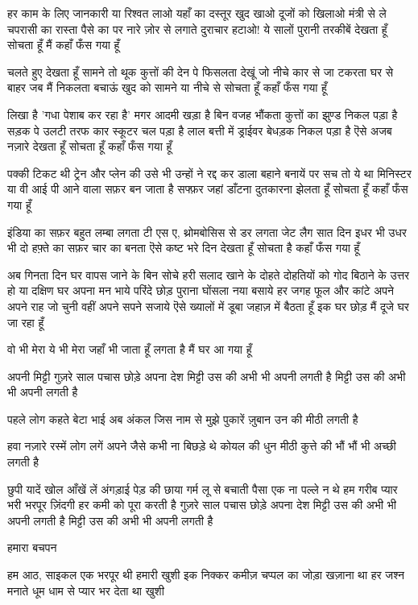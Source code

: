 हर काम के लिए जानकारी या रिश्वत लाओ
यहाँ का दस्तूर खुद खाओ दूजों को खिलाओ 
मंत्री से ले चपरासी का रास्ता पैसे का
पर नारे ज़ोर से लगाते दुराचार हटाओ!
ये सालों पुरानी तरकीबें देखता हूँ
सोचता हूँ मैं कहाँ फँस गया हूँ

चलते हुए देखता हूँ सामने तो
थूक कुत्तों की देन पे फिसलता
देखूं जो नीचे कार से जा टकरता
घर से बाहर जब मैं निकलता
बचाऊं खुद को सामने या नीचे से
सोचता हूँ कहाँ फँस गया हूँ

लिखा है 'गधा पेशाब कर रहा है' 
मगर आदमी खड़ा है
बिन वजह भौंकता कुत्तों का झुण्ड 
निकल पड़ा है
सड़क पे उलटी तरफ कार स्कूटर चल पड़ा है
लाल बत्ती में ड्राईवर बेधड़क निकल पड़ा है
ऎसे अजब नज़ारे देखता हूँ
सोचता हूँ कहाँ फँस गया हूँ

पक्की टिकट थी ट्रेन और प्लेन की
उसे भी उन्हों ने रद्द कर डाला
बहाने बनायें पर सच तो ये था
मिनिस्टर या वी आई पी आने वाला
सफ़र बन जाता है सफ्फ़र जहां
डाँटना दुतकारना झेलता हूँ
सोचता हूँ कहाँ फँस गया हूँ

इंडिया का सफ़र बहुत लम्बा लगता
टी एस ए, थ्रोमबोसिस से डर लगता
जेट लैग सात दिन इधर भी उधर भी
दो हफ़्ते का सफ़र चार का बनता
ऎसे कष्ट भरे दिन देखता हूँ
सोचता है कहाँ फँस गया हूँ

अब गिनता दिन घर वापस जाने के
बिन सोचे हरी सलाद खाने के
दोहते दोहतियों को गोद बिठाने के
उत्तर हो या दक्षिण घर अपना मन भाये
परिंदे छोड़ पुराना घोंसला नया बसाये
हर जगह फूल और कांटे अपने अपने
राह जो चुनी वहीं अपने सपने सजाये
ऎसे ख्यालों में डूबा जहाज़ में बैठता हूँ
इक घर छोड़ मैं दूजे घर जा रहा हूँ

वो भी मेरा ये भी मेरा जहाँ भी जाता हूँ
लगता है मैं घर आ गया हूँ






अपनी मिट्टी
गुज़रे साल पचास छोड़े अपना देश
मिट्टी उस की अभी भी अपनी लगती है
मिट्टी उस की अभी भी अपनी लगती है

पहले लोग कहते बेटा भाई अब अंकल
जिस नाम से मुझे पुकारें
ज़ुबान उन की मीठी लगती है

हवा नज़ारे रस्में लोग लगें अपने
जैसे कभी ना बिछड़े थे
कोयल की धुन मीठी
कुत्ते की भौं भौं भी अच्छी लगती है

छुपी यादें खोल आँखें लें अंगड़ाई
पेड़ की छाया गर्म लू से बचाती
पैसा एक ना पल्ले न थे हम गरीब
प्यार भरी भरपूर ज़िंदगी
हर कमी को पूरा करती है
गुज़रे साल पचास छोड़े अपना देश
मिट्टी उस की अभी भी अपनी लगती है
मिट्टी उस की अभी भी अपनी लगती है







हमारा बचपन

हम आठ, साइकल एक
भरपूर थी हमारी खुशी
इक निक्कर कमीज़
चप्पल का जोड़ा खज़ाना था
हर जश्न मनाते धूम धाम से
प्यार भर देता था खुशी


